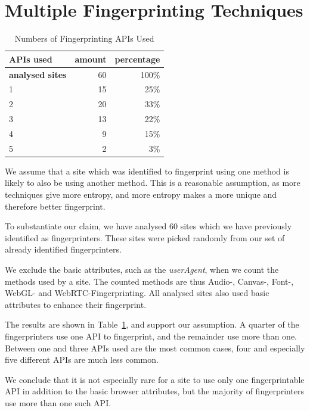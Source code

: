 \documentclass[
    fontsize=12pt,
    headings=small,
    parskip=half,
    bibliography=totoc,
    numbers=noenddot,
    open=any
    ]{scrreprt}
\begin{document}
\section{Multiple Fingerprinting Techniques}
\label{sec:correlation}

\begin{table}
\centering
\caption{Numbers of Fingerprinting APIs Used}
\begin{tabular}{l r r}
    \toprule
    APIs used & amount & percentage \\
    \midrule
    \textbf{analysed sites} & 60 & 100\% \\
    \midrule
    1 & 15 & 25\% \\
    2 & 20 & 33\% \\
    3 & 13 & 22\% \\
    4 & 9 & 15\% \\
    5 & 2 & 3\% \\
    \bottomrule
\end{tabular}
\label{table:multiple_apis}
\end{table}

We assume that a site which was identified to fingerprint using one method is likely
to also be using another method.
This is a reasonable assumption, as more techniques give more entropy, and more entropy makes a more
unique and therefore better fingerprint.

To substantiate our claim, we have analysed 60 sites which we have previously identified as fingerprinters.
These sites were picked randomly from our set of already identified fingerprinters.

We exclude the basic attributes, such as the \textit{userAgent}, when we count the methods used by a site.
The counted methods are thus Audio-, Canvas-, Font-, WebGL- and WebRTC-Fingerprinting.
All analysed sites also used basic attributes to enhance their fingerprint.

The results are shown in Table~\ref{table:multiple_apis}, and support our assumption. A quarter of the fingerprinters
use one API to fingerprint, and the remainder use more than one.
Between one and three APIs used are the most common cases, four and especially five different APIs are much less common.

We conclude that it is not especially rare for a site to use only one fingerprintable API in addition
to the basic browser attributes, but the majority of fingerprinters use more than one such API.
\end{document}

